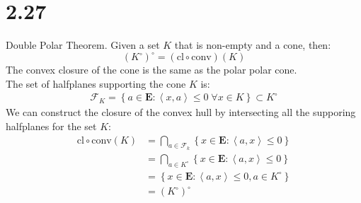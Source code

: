 \documentclass[]{article}
\begin{document}
\section*{2.27}
    Double Polar Theorem. Given a set $K$ that is non-empty and a cone, then: 
    $$
    (K^{\circ})^{\circ} = (\text{cl}\circ \text{conv})(K)
    $$
    The convex closure of the cone is the same as the polar polar cone. 
    \\
    The set of halfplanes supporting the cone $K$ is: 
    \begin{align*}\tag{2.27.1}\label{eqn:2.27.1}
        \mathcal{F}_K = \left\lbrace
            a \in \mathbf{E}: \left\langle x, a \right\rangle\le 0 \; \forall x \in K
        \right\rbrace \subset K^{\circ}
    \end{align*}
    We can construct the closure of the convex hull by intersecting all the supporing halfplanes for the set $K$: 
    \begin{align*}\tag{2.27.2}\label{eqn:2.27.2}
        \text{cl}\circ \text{conv}(K) &= 
        \bigcap_{a \in \mathcal{F}_k} 
        \left\lbrace
            x \in \mathbf{E}: \left\langle a, x \right\rangle \le 0
        \right\rbrace
        \\
        &= 
        \bigcap_{a \in K^{\circ}} 
        \left\lbrace
            x \in \mathbf{E}: \left\langle a, x \right\rangle \le 0
        \right\rbrace
        \\
        &= \left\lbrace
           x \in \mathbf{E} : \left\langle a, x \right\rangle \le 0 , a \in K^{\circ}
        \right\rbrace
        \\
        &= (K^{\circ})^{\circ}
    \end{align*}
\end{document}
